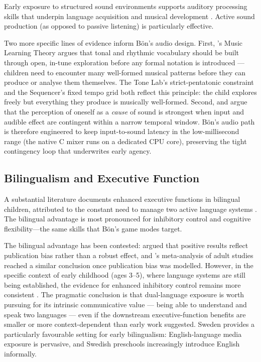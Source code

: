\documentclass[12pt, a4paper]{article}
\newcommand{\Bodn}{B\"o\dh{}n}
\begin{document}
Early exposure to structured sound environments supports auditory processing
skills that underpin language acquisition and musical development
\citep{kraus2010music, trainor2005critical}. Active sound production (as
opposed to passive listening) is particularly effective.

Two more specific lines of evidence inform \Bodn{}'s audio design. First,
\citet{gordon2003learning}'s Music Learning Theory argues that tonal and
rhythmic vocabulary should be built through open, in-tune exploration before
any formal notation is introduced --- children need to encounter many
well-formed musical patterns before they can produce or analyse them
themselves. The Tone Lab's strict-pentatonic constraint and the Sequencer's
fixed tempo grid both reflect this principle: the child explores freely but
everything they produce is musically well-formed. Second,
\citet{watson1985perception} and \citet{rochat2001infant} argue that the
perception of oneself as a \emph{cause} of sound is strongest when input and
audible effect are contingent within a narrow temporal window. \Bodn{}'s audio
path is therefore engineered to keep input-to-sound latency in the
low-millisecond range (the native C mixer runs on a dedicated CPU core),
preserving the tight contingency loop that underwrites early agency.

\subsection{Bilingualism and Executive Function}
\label{sec:bilingualism}

A substantial literature documents enhanced executive functions in bilingual
children, attributed to the constant need to manage two active language systems
\citep{bialystok2011reshaping}. The bilingual advantage is most pronounced for
inhibitory control and cognitive flexibility---the same skills that \Bodn{}'s
game modes target.

The bilingual advantage has been contested:
\citet{paap2015bilingualism} argued that positive results reflect publication
bias rather than a robust effect, and \citet{lehtonen2018bilingualism}'s
meta-analysis of adult studies reached a similar conclusion once publication
bias was modelled. However, in the specific context of early childhood (ages
3--5), where language systems are still being established, the evidence for
enhanced inhibitory control remains more consistent
\citep{bialystok2011reshaping, barac2014cognitive}. The pragmatic conclusion
is that dual-language exposure is worth pursuing for its intrinsic
communicative value --- being able to understand and speak two languages ---
even if the downstream executive-function benefits are smaller or more
context-dependent than early work suggested. Sweden provides a particularly
favourable setting for early bilingualism: English-language media exposure is
pervasive, and Swedish preschools increasingly introduce English informally.
\end{document}

